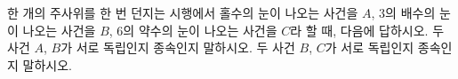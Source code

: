 한 개의 주사위를 한 번 던지는 시행에서 홀수의 눈이 나오는 사건을 $A$, $3$의 배수의 눈이 나오는 사건을 $B$, $6$의 약수의 눈이 나오는 사건을 $C$라 할 때, 다음에 답하시오.
 두 사건 $A$, $B$가 서로 독립인지 종속인지 말하시오.
 두 사건 $B$, $C$가 서로 독립인지 종속인지 말하시오.
